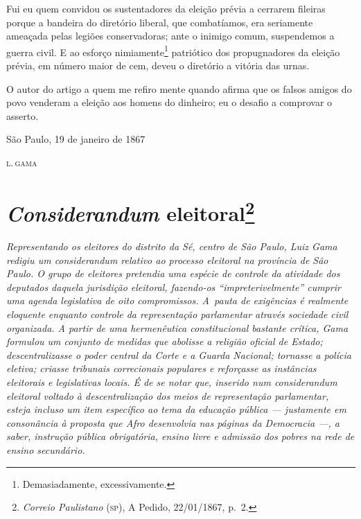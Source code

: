 Fui eu quem convidou os sustentadores da eleição prévia a cerrarem
fileiras porque a bandeira do diretório liberal, que combatíamos, era
seriamente ameaçada pelas legiões conservadoras; ante o inimigo comum,
suspendemos a guerra civil. E ao esforço nimiamente\footnote{Demasiadamente,
  excessivamente.} patriótico dos propugnadores da eleição prévia, em
número maior de cem, deveu o diretório a vitória das urnas.

O autor do artigo a quem me refiro mente quando afirma que os falsos
amigos do povo venderam a eleição aos homens do dinheiro; eu o desafio a
comprovar o asserto.

\begin{flushright}
São Paulo, 19 de janeiro de 1867

\textsc{l.\,gama}
\end{flushright}

\chapter{\emph{Considerandum} eleitoral\footnote{\emph{Correio
  Paulistano} (\textsc{sp}), A Pedido, 22/01/1867, p.~2.}}

\begin{didascalia}\itshape
Representando os eleitores do distrito da Sé, centro de São Paulo, Luiz
Gama redigiu um \textnormal{considerandum} relativo ao processo eleitoral na
província de São Paulo. O grupo de eleitores pretendia uma espécie de
controle da atividade dos deputados daquela jurisdição eleitoral,
fazendo-os ``impreterivelmente'' cumprir uma agenda legislativa de oito
compromissos. A~pauta de exigências é realmente eloquente enquanto
controle da representação parlamentar através sociedade civil
organizada. A partir de uma hermenêutica constitucional bastante
crítica, Gama formulou um conjunto de medidas que abolisse a religião
oficial de Estado; descentralizasse o poder central da Corte e a Guarda
Nacional; tornasse a polícia eletiva; criasse tribunais correcionais
populares e reforçasse as instâncias eleitorais e legislativas locais. É
de se notar que, inserido num \textnormal{considerandum} eleitoral voltado à
descentralização dos meios de representação parlamentar, esteja incluso
um item específico ao tema da educação pública --- justamente em
consonância à proposta que Afro desenvolvia nas páginas da
\textnormal{Democracia} ---, a saber, instrução pública obrigatória, ensino
livre e admissão dos pobres na rede de ensino secundário.
\end{didascalia}



